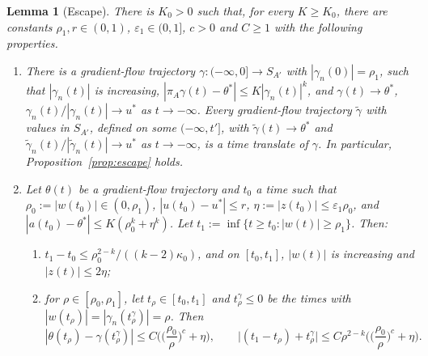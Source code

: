 \documentclass[11pt]{article}
\newtheorem{lemma}[theorem]{Lemma}
\theoremstyle{definition}
\theoremstyle{remark}
\numberwithin{equation}{section}
\newcommand{\eps}{\varepsilon}
\begin{document}
\begin{lemma}[Escape]\label{lem:escape}
There is $K_0>0$ such that, for every $K\ge K_0$, there are constants $\rho_1,r\in(0,1)$, $\eps_1\in(0,1]$, $c>0$ and $C\ge1$ with the following properties.
\begin{enumerate}[label=\textup{(\alph*)}]
\item There is a gradient-flow trajectory $\gamma\colon(-\infty,0]\to S_{A'}$ with $|\gamma_n(0)|=\rho_1$, such that $|\gamma_n(t)|$ is increasing, $|\pi_A\gamma(t)-\theta^*|\le K|\gamma_n(t)|^k$, and $\gamma(t)\to\theta^*$, $\gamma_n(t)/|\gamma_n(t)|\to u^*$ as $t\to-\infty$. Every gradient-flow trajectory $\tilde\gamma$ with values in $S_{A'}$, defined on some $(-\infty,t']$, with $\tilde\gamma(t)\to\theta^*$ and $\tilde\gamma_n(t)/|\tilde\gamma_n(t)|\to u^*$ as $t\to-\infty$, is a time translate of $\gamma$. In particular, Proposition~\ref{prop:escape} holds.
\item Let $\theta(t)$ be a gradient-flow trajectory and $t_0$ a time such that $\rho_0:=|w(t_0)|\in(0,\rho_1)$, $|u(t_0)-u^*|\le r$, $\eta:=|z(t_0)|\le\eps_1\rho_0$, and $|a(t_0)-\theta^*|\le K(\rho_0^k+\eta^k)$. Let $t_1:=\inf\{t\ge t_0:|w(t)|\ge\rho_1\}$. Then:
\begin{enumerate}[label=\textup{(b\arabic*)}]
\item $t_1-t_0\le\rho_0^{2-k}/((k-2)\kappa_0)$, and on $[t_0,t_1]$, $|w(t)|$ is increasing and $|z(t)|\le2\eta$;
\item for $\rho\in[\rho_0,\rho_1]$, let $t_\rho\in[t_0,t_1]$ and $t^\gamma_\rho\le0$ be the times with $|w(t_\rho)|=|\gamma_n(t^\gamma_\rho)|=\rho$. Then
\[
|\theta(t_\rho)-\gamma(t^\gamma_\rho)|\le C\Big(\Big(\frac{\rho_0}{\rho}\Big)^c+\eta\Big),\qquad\big|(t_1-t_\rho)+t^\gamma_\rho\big|\le C\rho^{2-k}\Big(\Big(\frac{\rho_0}{\rho}\Big)^c+\eta\Big).
\]
\end{enumerate}
\end{enumerate}
\end{lemma}
\end{document}
